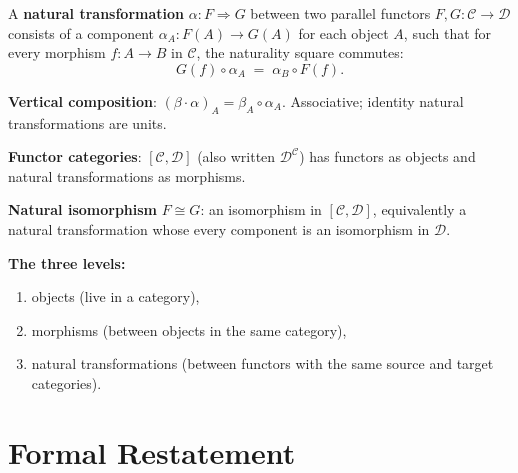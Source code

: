 \begin{summarybox}
A \textbf{natural transformation} $\alpha : F \Rightarrow G$ between two
parallel functors $F, G : \mathcal{C} \to \mathcal{D}$ consists of a
component $\alpha_A : F(A) \to G(A)$ for each object $A$, such that for
every morphism $f : A \to B$ in $\mathcal{C}$, the naturality square
commutes:
\begin{equation*}
  G(f) \circ \alpha_A \;=\; \alpha_B \circ F(f).
\end{equation*}

\textbf{Vertical composition}: $(\beta \cdot \alpha)_A = \beta_A \circ
\alpha_A$. Associative; identity natural transformations are units.

\textbf{Functor categories}: $[\mathcal{C}, \mathcal{D}]$ (also written
$\mathcal{D}^{\mathcal{C}}$) has functors as objects and natural
transformations as morphisms.

\textbf{Natural isomorphism} $F \cong G$: an isomorphism in
$[\mathcal{C}, \mathcal{D}]$, equivalently a natural transformation whose
every component is an isomorphism in $\mathcal{D}$.

\medskip
\textbf{The three levels:}
\begin{enumerate}
  \item objects (live in a category),
  \item morphisms (between objects in the same category),
  \item natural transformations (between functors with the same source and
        target categories).
\end{enumerate}
\end{summarybox}

\section*{Formal Restatement}

